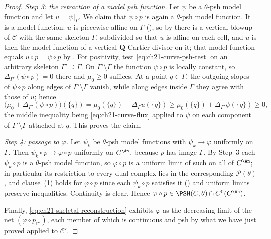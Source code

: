 \begin{proof}
\emph{Step 3: the retraction of a model psh function.}  Let \(\psi\) be a
\(\theta\)-psh model function and let \(u=\psi|_{\Gamma}\).  We claim that
\(\psi\circ p\) is again a \(\theta\)-psh model function.  It is a model
function: \(u\) is piecewise affine on \(\Gamma\)
(), so by  there
is a vertical blowup of \(\mathcal C\) with the same skeleton \(\Gamma\),
subdivided so that \(u\) is affine on each cell, and \(u\) is then the model
function of a vertical \(\mathbf Q\)-Cartier divisor on it; that model
function equals \(u\circ p=\psi\circ p\) by
.  For positivity, test
\eqref{eq:ch21-curve-psh-test} on an arbitrary skeleton
\(\Gamma'\supseteq\Gamma\).  On \(\Gamma'\setminus\Gamma\) the function
\(\psi\circ p\) is locally constant, so
\(\Delta_{\Gamma'}(\psi\circ p)=0\) there and \(\mu_0\geq0\) suffices.  At a
point \(q\in\Gamma\), the outgoing slopes of \(\psi\circ p\) along edges of
\(\Gamma'\setminus\Gamma\) vanish, while along edges inside \(\Gamma\) they
agree with those of \(u\); hence
\[
 \bigl(\mu_0+\Delta_{\Gamma'}(\psi\circ p)\bigr)(\{q\})
 =\mu_0(\{q\})+\Delta_{\Gamma}u(\{q\})
 \geq\mu_0(\{q\})+\Delta_{\Gamma'}\psi(\{q\})
 \geq0,
\]
the middle inequality being \eqref{eq:ch21-curve-flux} applied to \(\psi\)
on each component of \(\Gamma'\setminus\Gamma\) attached at \(q\).  This
proves the claim.

\emph{Step 4: passage to \(\varphi\).}  Let \(\psi_k\) be \(\theta\)-psh
model functions with \(\psi_k\to\varphi\) uniformly on \(\Gamma\).  Then
\(\psi_k\circ p\to\varphi\circ p\) uniformly on \(C^{\An}\), because
\(p\) has image \(\Gamma\).  By Step~3 each \(\psi_k\circ p\) is a
\(\theta\)-psh model function, so \(\varphi\circ p\) is a uniform limit of
such on all of \(C^{\An}\); in particular its restriction to every dual
complex lies in the corresponding \(\mathcal P(\theta)\), and clause~(1)
holds for \(\varphi\circ p\) since each \(\psi_k\circ p\) satisfies it
() and uniform limits preserve
inequalities.  Continuity is clear.  Hence
\(\varphi\circ p\in\PSH(C,\theta)\cap C^0(C^{\An})\).

Finally, \eqref{eq:ch21-skeletal-reconstruction} exhibits \(\varphi\) as the
decreasing limit of the net \((\varphi\circ p_{\mathcal C'})\), each member
of which is continuous and psh by what we have just proved applied to
\(\mathcal C'\).
\end{proof}

